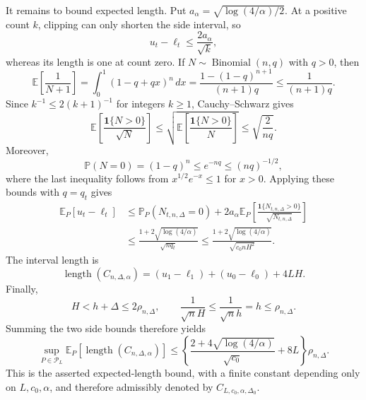 It remains to bound expected length.  Put \(a_\alpha=\sqrt{\log(4/\alpha)/2}\).  At a positive count \(k\), clipping can only shorten the side interval, so
\[
 u_t-\ell_t\leq\frac{2a_\alpha}{\sqrt{k}},
\]
whereas its length is one at count zero.  If \(N\sim\operatorname{Binomial}(n,q)\) with \(q>0\), then
\[
 \mathbb E\!\left[\frac1{N+1}\right]
 =\int_0^1(1-q+qx)^n\,dx
 =\frac{1-(1-q)^{n+1}}{(n+1)q}
 \leq\frac1{(n+1)q}.
\]
Since \(k^{-1}\leq2(k+1)^{-1}\) for integers \(k\geq1\), Cauchy--Schwarz gives
\[
 \mathbb E\!\left[\frac{\mathbf1\{N>0\}}{\sqrt N}\right]
 \leq\sqrt{\mathbb E\!\left[\frac{\mathbf1\{N>0\}}N\right]}
 \leq\sqrt{\frac2{nq}}.
\]
Moreover,
\[
 \mathbb P(N=0)=(1-q)^n\leq e^{-nq}\leq(nq)^{-1/2},
\]
where the last inequality follows from \(x^{1/2}e^{-x}\leq1\) for \(x>0\).  Applying these bounds with \(q=q_t\) gives
\[
 \begin{aligned}
 \mathbb E_P[u_t-\ell_t]
 &\leq \mathbb P_P(N_{t,n,\Delta}=0)
   +2a_\alpha\mathbb E_P\!\left[
      \frac{\mathbf1\{N_{t,n,\Delta}>0\}}{\sqrt{N_{t,n,\Delta}}}
    \right]\\
 &\leq\frac{1+2\sqrt{\log(4/\alpha)}}{\sqrt{nq_t}}
 \leq\frac{1+2\sqrt{\log(4/\alpha)}}{\sqrt{c_0nH^2}}.
 \end{aligned}
\]
The interval length is
\[
 \operatorname{length}(C_{n,\Delta,\alpha})
 =(u_1-\ell_1)+(u_0-\ell_0)+4LH.
\]
Finally,
\[
 H<h+\Delta\leq2\rho_{n,\Delta},
 \qquad
 \frac1{\sqrt nH}\leq\frac1{\sqrt nh}=h\leq\rho_{n,\Delta}.
\]
Summing the two side bounds therefore yields
\[
 \sup_{P\in\mathcal P_L}\mathbb E_P[\operatorname{length}(C_{n,\Delta,\alpha})]
 \leq
 \left\{
 \frac{2+4\sqrt{\log(4/\alpha)}}{\sqrt{c_0}}+8L
 \right\}\rho_{n,\Delta}.
\]
This is the asserted expected-length bound, with a finite constant depending only on \(L,c_0,\alpha\), and therefore admissibly denoted by \(C_{L,c_0,\alpha,\Delta_0}\).